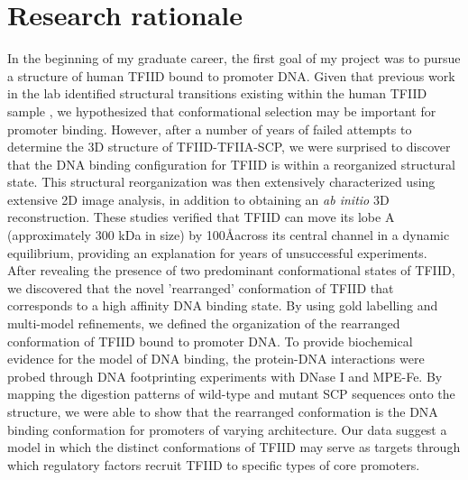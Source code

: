 \section{Research rationale}

In the beginning of my graduate career, the first goal of my project was to pursue a structure of human TFIID bound to promoter DNA. Given that previous work in the lab identified structural transitions existing within the human TFIID sample \cite{Grob_1281}, we hypothesized that conformational selection may be important for promoter binding. However, after a number of years of failed attempts to determine the 3D structure of TFIID-TFIIA-SCP, we were surprised to discover that the DNA binding configuration for TFIID is within a reorganized structural state. This structural reorganization was then extensively characterized using extensive 2D image analysis, in addition to obtaining an \emph{ab initio} 3D reconstruction. These studies verified that TFIID can move its lobe A (approximately 300 kDa in size) by 100\AA across its central channel in a dynamic equilibrium, providing an explanation for years of unsuccessful experiments. \\
\indent After revealing the presence of two predominant conformational states of TFIID, we discovered that the novel 'rearranged' conformation of TFIID that corresponds to a high affinity DNA binding state. By using gold labelling and multi-model refinements, we defined the organization of the rearranged conformation of TFIID bound to promoter DNA. To provide biochemical evidence for the model of DNA binding, the protein-DNA interactions were probed through DNA footprinting experiments with DNase I and MPE-Fe. By mapping the digestion patterns of wild-type and mutant SCP sequences onto the structure, we were able to show that the rearranged conformation is the DNA binding conformation for promoters of varying architecture. Our data suggest a model in which the distinct conformations of TFIID may serve as targets through which regulatory factors recruit TFIID to specific types of core promoters.\\

